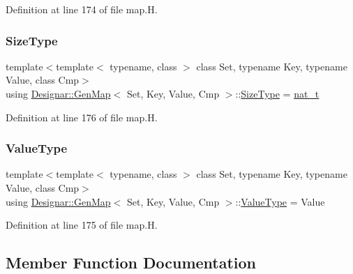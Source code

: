 Definition at line 174 of file map.\+H.

\mbox{\label{class_designar_1_1_gen_map_ad7fadcebeec688bb447f63c4bfabc61c}} 
\subsubsection{\texorpdfstring{Size\+Type}{SizeType}}
{\footnotesize\ttfamily template$<$template$<$ typename, class $>$ class Set, typename Key, typename Value, class Cmp$>$ \\
using \hyperlink{class_designar_1_1_gen_map}{Designar\+::\+Gen\+Map}$<$ Set, Key, Value, Cmp $>$\+::\hyperlink{class_designar_1_1_gen_map_ad7fadcebeec688bb447f63c4bfabc61c}{Size\+Type} =  \hyperlink{namespace_designar_aa72662848b9f4815e7bf31a7cf3e33d1}{nat\+\_\+t}}



Definition at line 176 of file map.\+H.

\mbox{\label{class_designar_1_1_gen_map_a525bf32010df09e293fa7a0db5a2a8ef}} 
\subsubsection{\texorpdfstring{Value\+Type}{ValueType}}
{\footnotesize\ttfamily template$<$template$<$ typename, class $>$ class Set, typename Key, typename Value, class Cmp$>$ \\
using \hyperlink{class_designar_1_1_gen_map}{Designar\+::\+Gen\+Map}$<$ Set, Key, Value, Cmp $>$\+::\hyperlink{class_designar_1_1_gen_map_a525bf32010df09e293fa7a0db5a2a8ef}{Value\+Type} =  Value}



Definition at line 175 of file map.\+H.



\subsection{Member Function Documentation}
\mbox{\label{class_designar_1_1_gen_map_ad5e2c8b57f6264ab98eec3a93e85b1a1}} 
